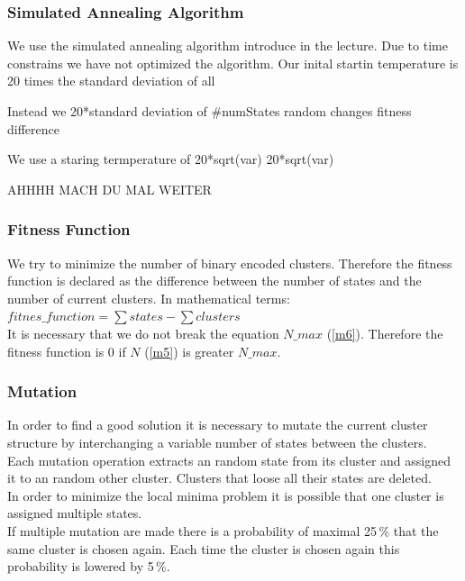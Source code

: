 \subsubsection{Simulated Annealing Algorithm}
\label{subsubsec:SAAlgorithm}

We use the simulated annealing algorithm introduce in the lecture. Due to time constrains we have not optimized the algorithm. Our inital startin temperature is 20 times the standard deviation of all 

Instead we 
20*standard deviation of #numStates random changes fitness difference

We use a staring termperature of 20*sqrt(var)
20*sqrt(var)

AHHHH MACH DU MAL WEITER



\subsubsection{Fitness Function}
\label{subsubsec:FitnessFunction}

We try to minimize the number of binary encoded clusters. Therefore the fitness function is declared as the difference between the number of states and the number of current clusters. In mathematical terms: 
$ fitnes\_function = \sum{states} - \sum{clusters} $\\
It is necessary that we do not break the equation  $N\_max$ (\ref{m6}). Therefore the fitness function is 0 if $ N $ (\ref{m5}) is greater $N\_max$. 

\subsubsection{Mutation}
\label{subsubsec:Mutation}

In order to find a good solution it is necessary to mutate the current cluster structure by interchanging a variable number of states between the clusters. \\
Each mutation operation extracts an random state from its cluster and assigned it to an random other cluster. Clusters that loose all their states are deleted. \\
In order to minimize the local minima problem it is possible that one cluster is assigned multiple states.\\
If multiple mutation are made there is a probability of maximal 25\,\% that the same cluster is chosen again. Each time the cluster is chosen again this probability is lowered by 5\,\%.


